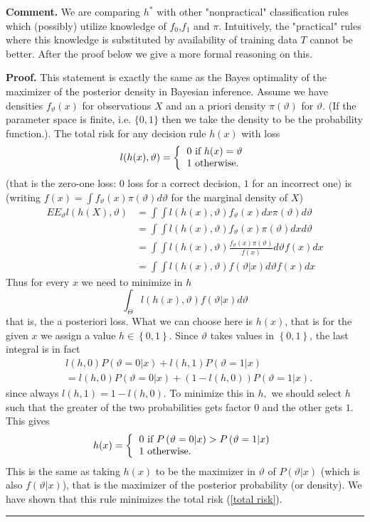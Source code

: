 \documentclass[11pt,twoside]{article}%
\theoremstyle{change}
\newenvironment{proof}[1][Proof]{\textbf{#1.} }{\ \rule{0.5em}{0.5em}}
\begin{document}
\textbf{Comment.} We are comparing $h^{\ast}$ with other "nonpractical"
classification rules which (possibly) utilize knowledge of $f_{0}$,$f_{1}$ and
$\pi$. Intuitively, the "practical" rules where this knowledge is substituted
by availability of training data $T$ cannot be better. After the proof below
we give a more formal reasoning on this.

\begin{proof}
This statement is exactly the same as the Bayes optimality of the maximizer of
the posterior density in Bayesian inference. Assume we have densities
$f_{\vartheta}(x)$ for observations $X$ and an a priori density $\pi
(\vartheta)$ for $\vartheta.$ (If the parameter space is finite, i.e.
$\{0,1\}$ then we take the density to be the probability function.). The total
risk for any decision rule $h(x)$ with loss
\[
l(h(x),\vartheta)=\left\{
\begin{tabular}
[c]{l}%
$0$ if $h(x)=\vartheta$\\
$1$ otherwise$.$%
\end{tabular}
\right.
\]
(that is the zero-one loss: $0$ loss for a correct decision, $1$ for an
incorrect one) is (writing $f(x)=\int f_{\vartheta}(x)\pi(\vartheta
)d\vartheta$ for the marginal density of $X$)
\begin{align}
EE_{\vartheta}l(h(X),\vartheta)  & =\int\int l(h(x),\vartheta)f_{\vartheta
}(x)dx\pi(\vartheta)d\vartheta\label{total risk}\\
& =\int\int l(h(x),\vartheta)f_{\vartheta}(x)\pi(\vartheta)dxd\vartheta
\nonumber\\
& =\int\int l(h(x),\vartheta)\frac{f_{\vartheta}(x)\pi(\vartheta)}%
{f(x)}d\vartheta f(x)dx\nonumber\\
& =\int\int l(h(x),\vartheta)f(\vartheta|x)d\vartheta f(x)dx\nonumber
\end{align}
Thus for every $x$ we need to minimize in $h$
\[
\int_{\Theta}l(h(x),\vartheta)f(\vartheta|x)d\vartheta
\]
that is, the a posteriori loss. What we can choose here is $h(x)$, that is for
the given $x$ we assign a value $h\in\left\{  0,1\right\}  $. Since
$\vartheta$ takes values in $\left\{  0,1\right\}  $, the last integral is in
fact
\begin{align*}
& l(h,0)P\left(  \vartheta=0|x\right)  +l(h,1)P\left(  \vartheta=1|x\right) \\
& =l(h,0)P\left(  \vartheta=0|x\right)  +\left(  1-l(h,0)\right)  P\left(
\vartheta=1|x\right)  .
\end{align*}
since always $l(h,1)=1-l(h,0)$. To minimize this in $h,$ we should select $h$
such that the greater of the two probabilities gets factor $0$ and the other
gets $1.$ This gives%
\[
h(x)=\left\{
\begin{tabular}
[c]{l}%
$0$ if $P\left(  \vartheta=0|x\right)  >P\left(  \vartheta=1|x\right)  $\\
$1$ otherwise$.$%
\end{tabular}
\right.
\]
This is the same as taking $h(x)$ to be the maximizer in $\vartheta$ of
$P\left(  \vartheta|x\right)  $ (which is also $f(\vartheta|x)$), that is the
maximizer of the posterior probability (or density). We have shown that this
rule minimizes the total risk (\ref{total risk}).
\end{proof}
\end{document}
